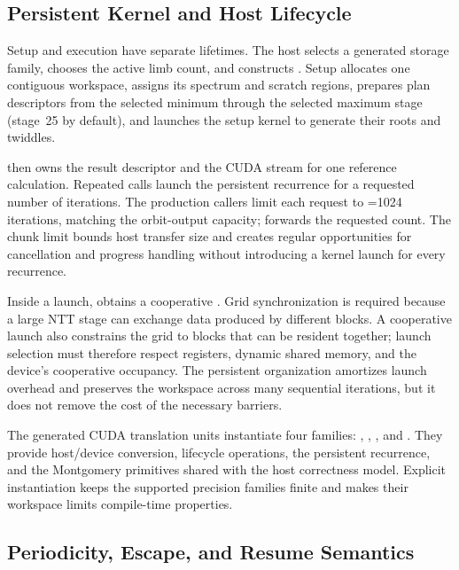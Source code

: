 \subsection{Persistent Kernel and Host Lifecycle}
\label{subsec:ref-orbit-architecture}

Setup and execution have separate lifetimes.  The host selects a generated
storage family, chooses the active limb count, and constructs
.  Setup allocates one contiguous workspace,
assigns its spectrum and scratch regions, prepares plan descriptors from the
selected minimum through the selected maximum stage (stage~25 by default),
and launches the setup kernel to
generate their roots and twiddles.

 then owns the result descriptor and the CUDA stream for
one reference calculation.  Repeated  calls launch the
persistent recurrence for a requested number of iterations.  The production
callers limit each request to =1024 iterations, matching
the orbit-output capacity;  forwards the requested count.
The chunk limit bounds host transfer size and creates regular opportunities for cancellation and progress
handling without introducing a kernel launch for every recurrence.

Inside a launch,  obtains a cooperative
.  Grid synchronization is required because a large NTT stage
can exchange data produced by different blocks.  A cooperative launch also
constrains the grid to blocks that can be resident together; launch selection
must therefore respect registers, dynamic shared memory, and the device's
cooperative occupancy.  The persistent organization amortizes launch overhead
and preserves the workspace across many sequential iterations, but it does not
remove the cost of the necessary barriers.

The generated CUDA translation units instantiate four families:
, ,
, and .  They provide
host/device conversion, lifecycle operations, the persistent recurrence, and
the Montgomery primitives shared with the host correctness model.  Explicit
instantiation keeps the supported precision families finite and makes their
workspace limits compile-time properties.

\subsection{Periodicity, Escape, and Resume Semantics}
\label{subsec:fused-ntt-periodicity}

